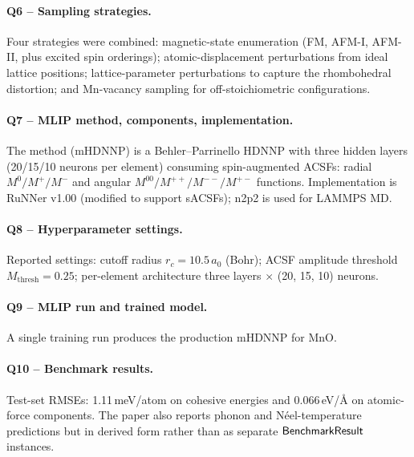\paragraph{Q6 -- Sampling strategies.}
Four strategies were combined: magnetic-state enumeration (FM, AFM-I,
AFM-II, plus excited spin orderings); atomic-displacement
perturbations from ideal lattice positions; lattice-parameter
perturbations to capture the rhombohedral distortion; and Mn-vacancy
sampling for off-stoichiometric configurations.


\paragraph{Q7 -- MLIP method, components, implementation.}
The method (mHDNNP) is a Behler--Parrinello HDNNP with three hidden
layers (20/15/10 neurons per element) consuming spin-augmented ACSFs:
radial $M^0/M^+/M^-$ and angular
$M^{00}/M^{++}/M^{--}/M^{+-}$ functions. Implementation is RuNNer
v1.00 (modified to support sACSFs); n2p2 is used for LAMMPS MD.


\paragraph{Q8 -- Hyperparameter settings.}
Reported settings: cutoff radius $r_c = 10.5\,a_0$ (Bohr); ACSF
amplitude threshold $M_{\text{thresh}} = 0.25$; per-element
architecture three layers $\times$ (20, 15, 10) neurons.


\paragraph{Q9 -- MLIP run and trained model.}
A single training run produces the production mHDNNP for MnO.


\paragraph{Q10 -- Benchmark results.}
Test-set RMSEs: 1.11\,meV/atom on cohesive energies and
0.066\,eV/\AA{} on atomic-force components. The paper also reports
phonon and N\'eel-temperature predictions but in derived form rather
than as separate $\mathsf{BenchmarkResult}$ instances.


